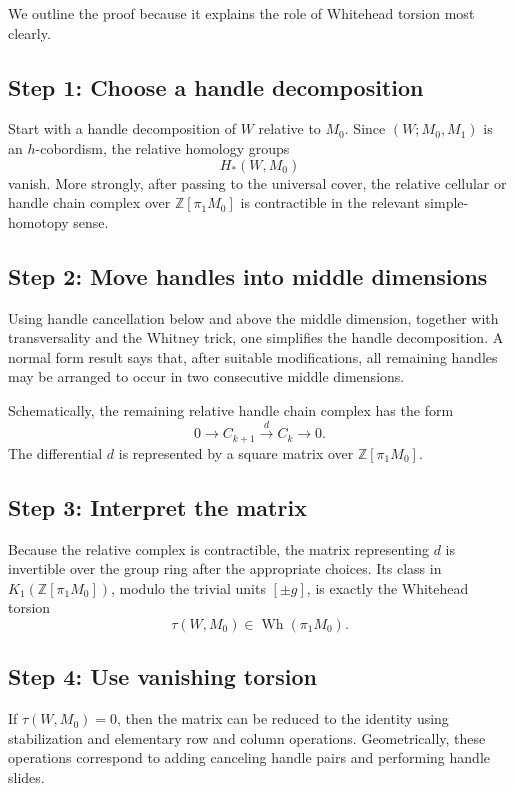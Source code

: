 \documentclass[11pt,a4paper]{article}
\newcommand{\Wh}{\operatorname{Wh}}
\newcommand{\ZZ}{\mathbb{Z}}
\theoremstyle{definition}
\theoremstyle{plain}
\theoremstyle{remark}
\begin{document}
We outline the proof because it explains the role of Whitehead torsion most clearly.

\subsection{Step 1: Choose a handle decomposition}

Start with a handle decomposition of \(W\) relative to \(M_0\). Since \((W;M_0,M_1)\) is an \(h\)-cobordism, the relative homology groups
\[
  H_*(W,M_0)
\]
vanish. More strongly, after passing to the universal cover, the relative cellular or handle chain complex over \(\ZZ[\pi_1M_0]\) is contractible in the relevant simple-homotopy sense.

\subsection{Step 2: Move handles into middle dimensions}

Using handle cancellation below and above the middle dimension, together with transversality and the Whitney trick, one simplifies the handle decomposition. A normal form result says that, after suitable modifications, all remaining handles may be arranged to occur in two consecutive middle dimensions.

Schematically, the remaining relative handle chain complex has the form
\[
  0\longrightarrow C_{k+1}\xrightarrow{d}C_k\longrightarrow 0.
\]
The differential \(d\) is represented by a square matrix over \(\ZZ[\pi_1M_0]\).

\subsection{Step 3: Interpret the matrix}

Because the relative complex is contractible, the matrix representing \(d\) is invertible over the group ring after the appropriate choices. Its class in \(K_1(\ZZ[\pi_1M_0])\), modulo the trivial units \([\pm g]\), is exactly the Whitehead torsion
\[
  \tau(W,M_0)\in \Wh(\pi_1M_0).
\]

\subsection{Step 4: Use vanishing torsion}

If \(\tau(W,M_0)=0\), then the matrix can be reduced to the identity using stabilization and elementary row and column operations. Geometrically, these operations correspond to adding canceling handle pairs and performing handle slides.
\end{document}
